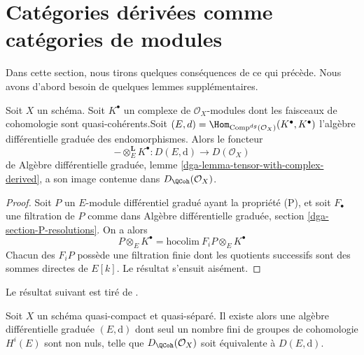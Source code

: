 \section{Catégories dérivées comme catégories de modules}
\label{section-derived-is-dga}

\noindent
Dans cette section, nous tirons quelques conséquences de ce qui précède.
Nous avons d'abord besoin de quelques lemmes supplémentaires.

\begin{lemma}
\label{lemma-tensor-with-QCoh-complex}
Soit $X$ un schéma. Soit $K^\bullet$ un complexe de $\mathcal{O}_X$-modules
dont les faisceaux de cohomologie sont quasi-cohérents.\newline Soit
$(E, d) = \Hom_{\text{Comp}^{dg}(\mathcal{O}_X)}(K^\bullet, K^\bullet)$
l'algèbre différentielle graduée des endomorphismes. Alors le foncteur
$$
- \otimes_E^\mathbf{L} K^\bullet :
D(E, \text{d}) \longrightarrow D(\mathcal{O}_X)
$$
de
Algèbre différentielle graduée, lemme
\ref{dga-lemma-tensor-with-complex-derived},
a son image contenue dans $D_\QCoh(\mathcal{O}_X)$.
\end{lemma}

\begin{proof}
Soit $P$ un $E$-module différentiel gradué ayant la propriété (P),
et soit $F_\bullet$ une filtration de $P$ comme dans
Algèbre différentielle graduée, section \ref{dga-section-P-resolutions}.
On a alors
$$
P \otimes_E K^\bullet = \text{hocolim}\ F_iP \otimes_E K^\bullet
$$
Chacun des $F_iP$ possède une filtration finie dont les quotients successifs
sont des sommes directes de $E[k]$. Le résultat s'ensuit aisément.
\end{proof}

\noindent
Le résultat suivant est tiré de \cite{BvdB}.

\begin{theorem}
\label{theorem-DQCoh-is-Ddga}
Soit $X$ un schéma quasi-compact et quasi-séparé.
Il existe alors une algèbre différentielle graduée $(E, \text{d})$
dont seul un nombre fini de groupes de cohomologie $H^i(E)$ sont non nuls,
telle que $D_\QCoh(\mathcal{O}_X)$ soit équivalente
à $D(E, \text{d})$.
\end{theorem}

